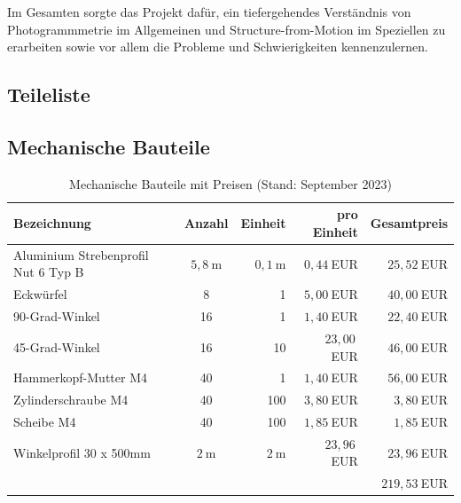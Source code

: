 \documentclass[a4paper,12pt,bibliography=totoc, listof=totoc,titlepage]{scrreprt}
\begin{document}
Im Gesamten sorgte das Projekt dafür, ein tiefergehendes Verständnis von Photogrammmetrie im Allgemeinen und Structure-from-Motion im Speziellen zu erarbeiten sowie vor allem die Probleme und Schwierigkeiten kennenzulernen.
\clearpage
\renewcommand\UrlFont\itshape
\renewcommand{\refname}{Literaturverzeichnis}

\listoffigures
\listoftables


\renewcommand{\appendixpagename}{\appendixname}
\renewcommand{\appendixtocname}{\appendixname}
\begin{appendices}

    \chapter{Teileliste}
    \section{Mechanische Bauteile}

    \begin{table}[h]
        \centering
        \begin{tabular}{l|c|r|r|r}
            Bezeichnung                         & Anzahl  & Einheit & pro Einheit & Gesamtpreis  \\
            \hline
            Aluminium Strebenprofil Nut 6 Typ B & $5,8~$m & $0,1~$m & $0,44~$EUR  & $25,52~$EUR  \\
            Eckwürfel                           & 8       & 1       & $5,00~$EUR  & $40,00~$EUR  \\
            90-Grad-Winkel                      & 16      & 1       & $1,40~$EUR  & $22,40~$EUR  \\
            45-Grad-Winkel                      & 16      & 10      & $23,00~$EUR & $46,00~$EUR  \\
            Hammerkopf-Mutter M4                & 40      & 1       & $1,40~$EUR  & $56,00~$EUR  \\
            Zylinderschraube M4                 & 40      & 100     & $3,80~$EUR  & $3,80~$EUR   \\
            Scheibe M4                          & 40      & 100     & $1,85~$EUR  & $1,85~$EUR   \\
            Winkelprofil 30 x 500mm             & $2~$m   & $2~$m   & $23,96~$EUR & $23,96~$EUR  \\
                                                &         &         &             & $219,53~$EUR \\
        \end{tabular}
        \caption{Mechanische Bauteile mit Preisen (Stand: September 2023)}
        \label{tab:bauteile_mechanisch}
    \end{table}

\end{appendices}
\end{document}
